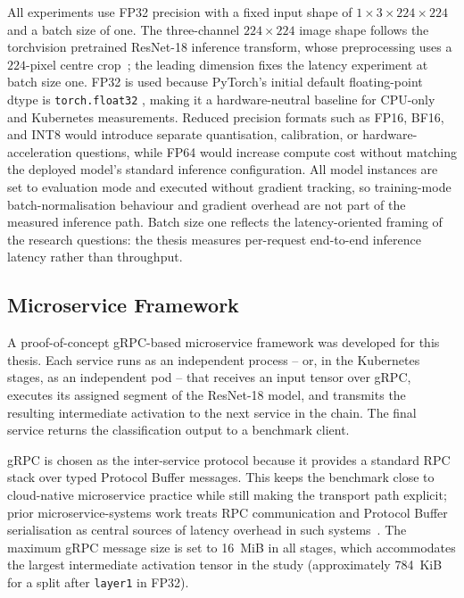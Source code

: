 All experiments use FP32 precision with a fixed input shape of
$1 \times 3 \times 224 \times 224$ and a batch size of one.
The three-channel $224 \times 224$ image shape follows the torchvision
pretrained ResNet-18 inference transform, whose preprocessing uses a
$224$-pixel centre crop~\cite{torchvision_resnet18_weights}; the leading
dimension fixes the latency experiment at batch size one. FP32 is used because
PyTorch's initial default floating-point dtype is \texttt{torch.float32}
\cite{pytorch_get_default_dtype}, making it a hardware-neutral baseline for
CPU-only and Kubernetes measurements. Reduced precision formats such as FP16,
BF16, and INT8 would introduce separate quantisation, calibration, or
hardware-acceleration questions, while FP64 would increase compute cost without
matching the deployed model's standard inference configuration.
All model instances are set to evaluation mode and executed without gradient
tracking, so training-mode batch-normalisation behaviour and gradient overhead are
not part of the measured inference path.
Batch size one reflects the latency-oriented framing of the research questions: the
thesis measures per-request end-to-end inference latency rather than throughput.

\subsection{Microservice Framework}

A proof-of-concept gRPC-based microservice framework was developed for this thesis.
Each service runs as an independent process -- or, in the Kubernetes stages, as an
independent pod -- that receives an input tensor over gRPC, executes its assigned
segment of the ResNet-18 model, and transmits the resulting intermediate activation to
the next service in the chain.
The final service returns the classification output to a benchmark client.

gRPC is chosen as the inter-service protocol because it provides a standard RPC stack
over typed Protocol Buffer messages.
This keeps the benchmark close to cloud-native microservice practice while still making
the transport path explicit; prior microservice-systems work treats RPC communication
and Protocol Buffer serialisation as central sources of latency overhead in such
systems~\cite{rpc_overhead_hotos25}.
The maximum gRPC message size is set to 16~MiB in all stages, which accommodates the
largest intermediate activation tensor in the study (approximately 784~KiB for a split
after \texttt{layer1} in FP32).


